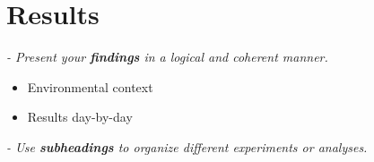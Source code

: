 \section{Results}
\textit{- Present your \textbf{findings} in a logical and coherent manner.}

\begin{itemize}
    \item Environmental context
    \item Results day-by-day
\end{itemize}

 
\textit{- Use \textbf{subheadings} to organize different experiments or analyses.}
